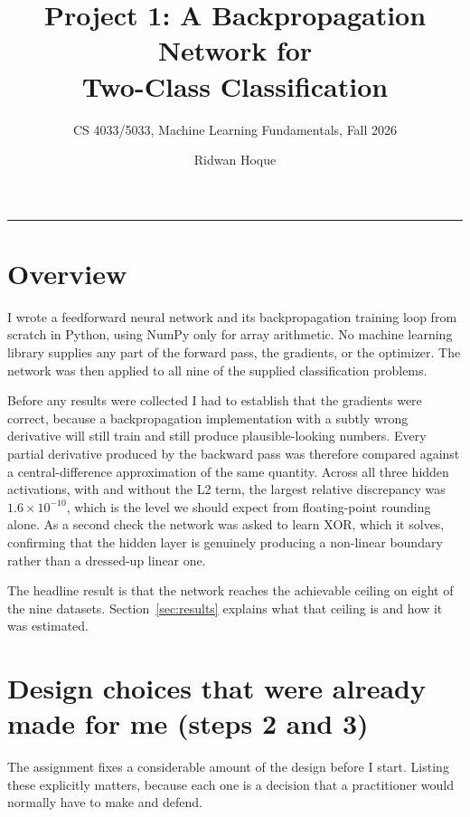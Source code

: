 \documentclass[11pt]{article}
\title{\vspace{-1.2cm}\textbf{Project 1: A Backpropagation Network for\\Two-Class Classification}}
\author{CS 4033/5033, Machine Learning Fundamentals, Fall 2026}
\date{Ridwan Hoque}
\begin{document}
\maketitle
\vspace{-0.6cm}
\noindent\rule{\textwidth}{0.4pt}

\section{Overview}

I wrote a feedforward neural network and its backpropagation training loop from
scratch in Python, using NumPy only for array arithmetic. No machine learning
library supplies any part of the forward pass, the gradients, or the optimizer.
The network was then applied to all nine of the supplied classification
problems.

Before any results were collected I had to establish that the gradients were
correct, because a backpropagation implementation with a subtly wrong
derivative will still train and still produce plausible-looking numbers. Every
partial derivative produced by the backward pass was therefore compared against
a central-difference approximation of the same quantity. Across all three
hidden activations, with and without the L2 term, the largest relative
discrepancy was $1.6 \times 10^{-10}$, which is the level we should expect from
floating-point rounding alone. As a second check the network was asked to learn
XOR, which it solves, confirming that the hidden layer is genuinely producing a
non-linear boundary rather than a dressed-up linear one.

The headline result is that the network reaches the achievable ceiling on eight
of the nine datasets. Section~\ref{sec:results} explains what that ceiling is
and how it was estimated.

\section{Design choices that were already made for me (steps 2 and 3)}
\label{sec:given}

The assignment fixes a considerable amount of the design before I start. Listing
these explicitly matters, because each one is a decision that a practitioner
would normally have to make and defend.
\end{document}
